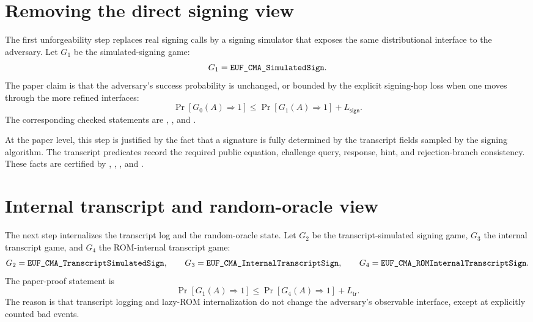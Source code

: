 \section{Removing the direct signing view}
\label{sec:paper-proof-simulated-signing}

The first unforgeability step replaces real signing calls by a signing simulator
that exposes the same distributional interface to the adversary.  Let \(G_1\)
be the simulated-signing game:
\[
  G_1 = \texttt{EUF\_CMA\_SimulatedSign}.
\]
The paper claim is that the adversary's success probability is unchanged, or
bounded by the explicit signing-hop loss when one moves through the more refined
interfaces:
\[
  \Pr[G_0(A)\Rightarrow 1]
  \le
  \Pr[G_1(A)\Rightarrow 1] + L_{\mathsf{sign}}.
\]
The corresponding checked statements are
,
, and
.

At the paper level, this step is justified by the fact that a signature is fully
determined by the transcript fields sampled by the signing algorithm.  The
transcript predicates record the required public equation, challenge query,
response, hint, and rejection-branch consistency.  These facts are certified by
,
,
, and
.

\section{Internal transcript and random-oracle view}
\label{sec:paper-proof-rom-internal}

The next step internalizes the transcript log and the random-oracle state.  Let
\(G_2\) be the transcript-simulated signing game, \(G_3\) the internal
transcript game, and \(G_4\) the ROM-internal transcript game:
\[
  G_2 = \texttt{EUF\_CMA\_TranscriptSimulatedSign},
  \qquad
  G_3 = \texttt{EUF\_CMA\_InternalTranscriptSign},
  \qquad
  G_4 = \texttt{EUF\_CMA\_ROMInternalTranscriptSign}.
\]
The paper-proof statement is
\[
  \Pr[G_1(A)\Rightarrow 1]
  \le
  \Pr[G_4(A)\Rightarrow 1] + L_{\mathsf{tr}}.
\]
The reason is that transcript logging and lazy-ROM internalization do not change
the adversary's observable interface, except at explicitly counted bad events.

